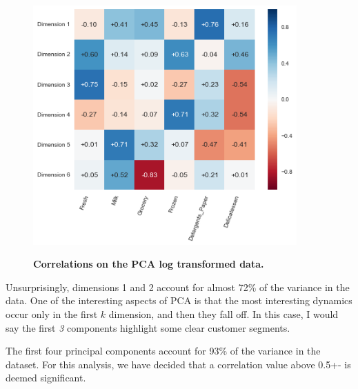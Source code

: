 \documentclass[twoside,openright,titlepage,numbers=noenddot,headinclude,%
               footinclude=true,cleardoublepage=empty,abstractoff,BCOR=5mm,%
               paper=a4,fontsize=11pt,ngerman,american]{scrreprt}
\numberwithin{theorem}{chapter}
\numberwithin{definition}{chapter}
\numberwithin{algorithm}{chapter}
\numberwithin{figure}{chapter}
\numberwithin{table}{chapter}
\numberwithin{equation}{chapter}
\begin{document}
\begin{figure}[!hbtp]
\centering
    
    \includegraphics[width=0.9\textwidth]{figures/pcaCorrelation}
    \label{pcaCorrelation}
    
    \caption{\textbf{Correlations on the PCA log transformed data. }}
\end{figure}


Unsurprisingly, dimensions 1 and 2 account for almost 72\% of the variance in the data. One of the interesting aspects of PCA is that the most interesting dynamics occur only in the first $k$ dimension, and then they fall off. In this case, I would say the first \emph{3} components highlight some clear customer segments.    

The first four principal components account for 93\% of the variance in the dataset. For this analysis, we have decided that a correlation value above 0.5+- is deemed significant. 
\end{document}
